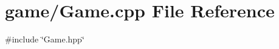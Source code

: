 \section{game/\+Game.cpp File Reference}
\label{_game_8cpp}
{\ttfamily \#include \char`\"{}Game.\+hpp\char`\"{}}\newline
